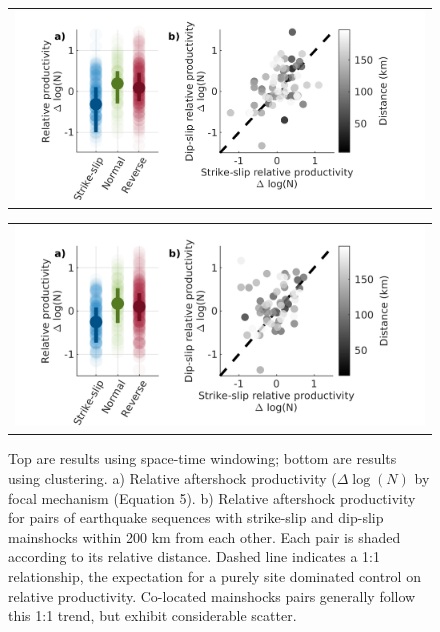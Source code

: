 \documentclass[draft]{agujournal}
\begin{document}

\newpage
\begin{figure}[H]
    \centering
    \begin{tabular}{@{}c@{}}
        \includegraphics{figures/fmspairs.png}
    \end{tabular}
    
    \begin{tabular}{@{}c@{}}
        \includegraphics{figures/fmspairs_z2008.png}
    \end{tabular}
    
    \caption{Top are results using space-time windowing; bottom are results using \citet{Zaliapin2008} clustering. a) Relative aftershock productivity ($\Delta \log(N)$ by focal mechanism (Equation 5). b) Relative aftershock productivity for pairs of earthquake sequences with strike-slip and dip-slip mainshocks within 200 km from each other. Each pair is shaded according to its relative distance. Dashed line indicates a 1:1 relationship, the expectation for a purely site dominated control on relative productivity. Co-located mainshocks pairs generally follow this 1:1 trend, but exhibit considerable scatter.}
        \label{fig:coloc_z2008}
\end{figure}
\end{document}
